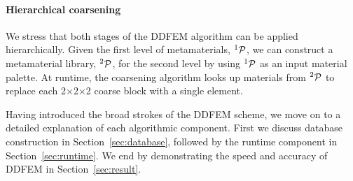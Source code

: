 \paragraph{Hierarchical coarsening}
We stress that both stages of the DDFEM algorithm can be applied hierarchically. Given the first level of metamaterials, $^1\mathcal{P}$, we can construct a metamaterial library, $^2\mathcal{P}$, for the second level by using $^1\mathcal{P}$ as an input material palette. At runtime, the coarsening algorithm looks up materials from $^2\mathcal{P}$ to replace each 2$\times$2$\times$2 coarse block with a single element.

Having introduced the broad strokes of the DDFEM scheme, we move on to a detailed explanation of each algorithmic component. First we discuss database construction in Section~\ref{sec:database}, followed by the runtime component in Section~\ref{sec:runtime}. We end by demonstrating the speed and accuracy of DDFEM in Section~\ref{sec:result}.